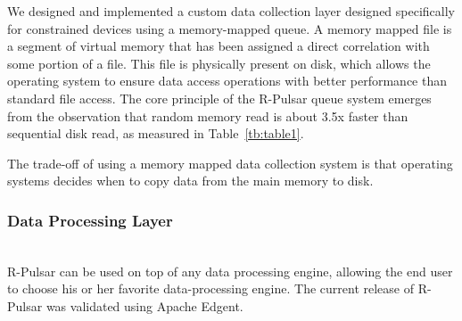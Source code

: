 We designed and implemented a custom data collection layer designed specifically for constrained devices using a memory-mapped queue. A memory mapped file is a segment of virtual memory that has been assigned a direct correlation with some portion of a file. This file is physically present on disk, which allows the operating system to ensure data access operations with better performance than standard file access. The core principle of the R-Pulsar queue system emerges from the observation that random memory read is about 3.5x faster than sequential disk read, as measured in Table~\ref{tb:table1}. 

The trade-off of using a memory mapped data collection system is that operating systems decides when to copy data from the main memory to disk. %

\begin{table}[h!]
\centering

\caption{Measurements of Disk I/O vs RAM memory performance on a Raspberry Pi.} \label{tb:table1}
\vspace{-2ex}
\end{table}

\vspace{1.5ex}
\subsubsection{Data Processing Layer}
\hfill\\
R-Pulsar can be used on top of any data processing engine, allowing the end user to choose his or her favorite data-processing engine. The current release of R-Pulsar was validated using Apache Edgent. 

